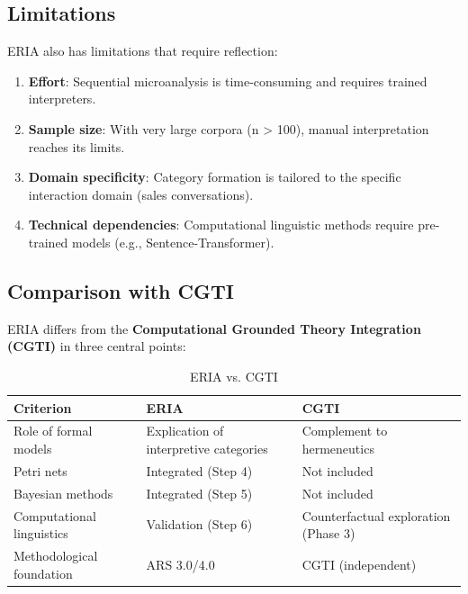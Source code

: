 \documentclass[12pt,a4paper]{article}
\begin{document}
\subsection{Limitations}

ERIA also has limitations that require reflection:

\begin{enumerate}
    \item \textbf{Effort}: Sequential microanalysis is time-consuming and requires trained interpreters.
    
    \item \textbf{Sample size}: With very large corpora (n > 100), manual interpretation reaches its limits.
    
    \item \textbf{Domain specificity}: Category formation is tailored to the specific interaction domain (sales conversations).
    
    \item \textbf{Technical dependencies}: Computational linguistic methods require pre-trained models (e.g., Sentence-Transformer).
\end{enumerate}

\subsection{Comparison with CGTI}

ERIA differs from the \textbf{Computational Grounded Theory Integration (CGTI)} in three central points:

\begin{table}[H]
\centering
\caption{ERIA vs. CGTI}
\label{tab:vergleich}
\begin{tabular}{@{} p{4cm} p{4cm} p{4cm} @{}}
\toprule
\textbf{Criterion} & \textbf{ERIA} & \textbf{CGTI} \\
\midrule
Role of formal models & Explication of interpretive categories & Complement to hermeneutics \\
Petri nets & Integrated (Step 4) & Not included \\
Bayesian methods & Integrated (Step 5) & Not included \\
Computational linguistics & Validation (Step 6) & Counterfactual exploration (Phase 3) \\
Methodological foundation & ARS 3.0/4.0 & CGTI (independent) \\
\bottomrule
\end{tabular}
\end{table}
\end{document}
